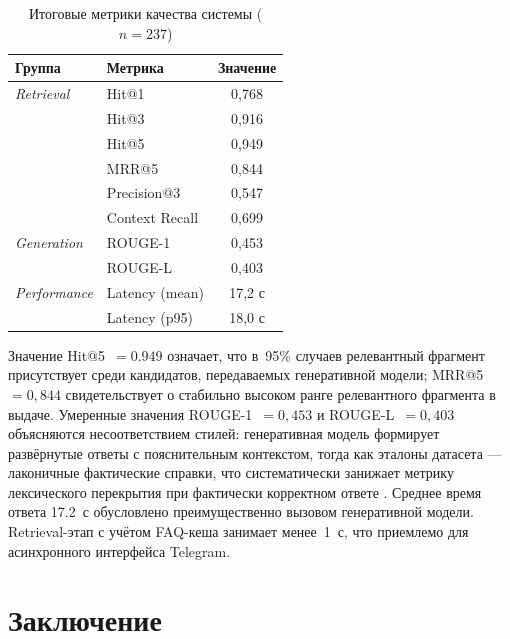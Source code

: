\documentclass{article}
\begin{document}
\begin{table}[H] %
\centering       %
\small

\begin{tabular}{llc}
\toprule
\textbf{Группа} & \textbf{Метрика} & \textbf{Значение} \\
\midrule
\textit{Retrieval}  & Hit@1           & 0,768 \\
                    & Hit@3           & 0,916 \\
                    & Hit@5           & 0,949 \\
                    & MRR@5           & 0,844 \\
                    & Precision@3     & 0,547 \\
                    & Context Recall  & 0,699 \\
\midrule
\textit{Generation} & ROUGE-1         & 0,453 \\
                    & ROUGE-L         & 0,403 \\
\midrule
\textit{Performance}& Latency (mean)  & 17,2 с \\
                    & Latency (p95)   & 18,0 с \\
\bottomrule
\end{tabular}
\caption{Итоговые метрики качества системы ($n=237$)}
\label{tab:final_metrics} %
\end{table} 
\noindent Значение Hit@5~$= 0.949$ означает, что в~95\% случаев релевантный фрагмент присутствует среди кандидатов, передаваемых генеративной модели; MRR@5~$= 0,844$ свидетельствует о стабильно высоком ранге релевантного фрагмента в выдаче. Умеренные значения ROUGE-1~$= 0,453$ и ROUGE-L~$= 0,403$ объясняются несоответствием стилей: генеративная модель формирует развёрнутые ответы с пояснительным контекстом, тогда как эталоны датасета — лаконичные фактические справки, что систематически занижает метрику лексического перекрытия при фактически корректном ответе . Среднее время ответа 17.2~с обусловлено преимущественно вызовом генеративной модели. Retrieval-этап с учётом FAQ-кеша занимает менее~1~с, что приемлемо для асинхронного интерфейса Telegram.



\section*{Заключение}
\end{document}
